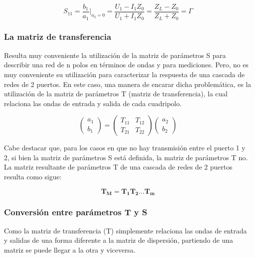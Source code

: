 \begin{equation}
S_{11} = \dfrac{b_1}{a_1}\bigg|_{a_2=0} = \dfrac{U_1 - I_1Z_0}{U_1 + I_1Z_0} = \dfrac{Z_L - Z_0}{Z_L + Z_0} = \Gamma
\end{equation}


\subsubsection{La matriz de transferencia} \label{ssec:transMatrix}

Resulta muy conveniente la utilización de la matriz de parámetros S para describir una red de n polos en términos de ondas y
para mediciones. Pero, no es muy conveniente su utilización para caracterizar la respuesta de una cascada de redes de 2
puertos. En este caso, una manera de encarar dicha problemática, es la utilización de la matriz de parámetros T (matriz
de transferencia), la cual relaciona las ondas de entrada y salida de cada cuadripolo.

\begin{equation}
\begin{pmatrix} a_1\\b_1 \end{pmatrix} = \begin{pmatrix} T_{11} & T_{12}\\T_{21} & T_{22} \end{pmatrix}
\begin{pmatrix} a_2\\b_2 \end{pmatrix}
\end{equation}

Cabe destacar que, para los casos en que no hay transmisión entre el puerto 1 y 2, si bien la matriz de parámetros S está definida,
la matriz de parámetros T no. La matriz resultante de parámetros T de una cascada de redes de 2 puertos resulta como sigue:

\begin{equation}
\mathbf{T_M=T_1T_2...T_m}
\label{eq:cascade}
\end{equation}

\subsubsection{Conversión entre parámetros T y S} \label{ssec:conversion}

Como la matriz de transferencia (T) simplemente relaciona las ondas de entrada y salidas de una forma diferente a la matriz de
dispersión, partiendo de una matriz se puede llegar a la otra y viceversa.

